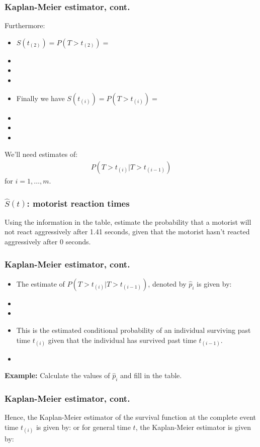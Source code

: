 \begin{frame}
\frametitle{Kaplan-Meier estimator, cont.}
Furthermore:
\begin{itemize}
\item $S(t_{(2)})=P(T>t_{(2)})=$
\item[]
\item[]
\item[]
\item Finally we have $S(t_{(i)})=P(T>t_{(i)})=$
\item[]
\item[]
\item[]
\end{itemize}
We'll need estimates of:
\begin{eqnarray}
P(T>t_{(i)}|T>t_{(i-1)}) \nonumber
\end{eqnarray}
for $i=1,\ldots,m$.
\end{frame}


\begin{frame}
\frametitle{$\widehat{S}(t)$: motorist reaction times}
Using the information in the table, estimate the probability that a motorist will not react aggressively after 1.41 seconds, given that the motorist hasn't reacted aggressively after 0 seconds.
\vskip200pt
\end{frame}


\begin{frame}
\frametitle{Kaplan-Meier estimator, cont.}
\begin{itemize}
\item[] The estimate of $P(T>t_{(i)}|T>t_{(i-1)})$, denoted by $\hat{p}_i$ is given by:
\item[]
\item[]
\item[] This is the estimated conditional probability of an individual surviving past time $t_{(i)}$ given that the individual has survived past
time $t_{(i-1)}$.
\item[]
\end{itemize}
\textbf{Example:}  Calculate the values of $\hat{p}_i$ and fill in the table.
\vskip 1.6in
\end{frame}

\begin{frame}
\frametitle{Kaplan-Meier estimator, cont.}
Hence, the Kaplan-Meier estimator of the survival function at the complete event time $t_{(i)}$ is given by:
\vskip50pt
or for general time $t$, the Kaplan-Meier estimator is given by:
\vskip50pt

\end{frame}

